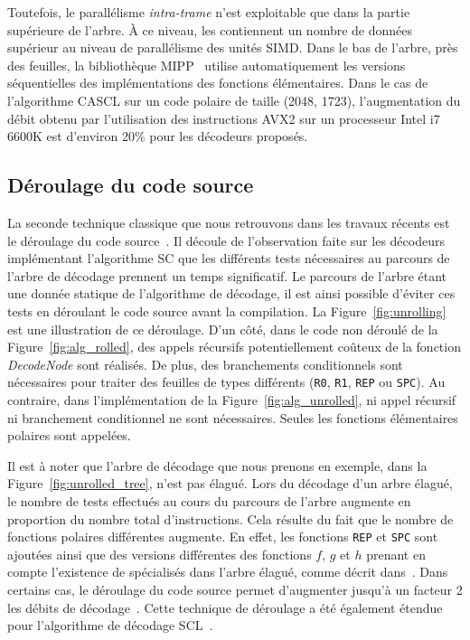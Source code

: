Toutefois, le parallélisme \textit{intra-trame} n'est exploitable que dans la partie supérieure de l'arbre. \`A ce niveau, les \noeuds contiennent un nombre de données supérieur au niveau de parallélisme des unités SIMD. Dans le bas de l'arbre, près des feuilles, la bibliothèque MIPP~\cite{cassagne_efficient_2015} utilise automatiquement les versions séquentielles des implémentations des fonctions élémentaires. Dans le cas de l'algorithme CASCL sur un code polaire de taille (2048, 1723), l'augmentation du débit obtenu par l'utilisation des instructions AVX2 sur un processeur Intel i7 6600K est d'environ 20\% pour les décodeurs proposés.

\subsection{Déroulage du code source}
\label{subsec:unroll}
La seconde technique classique que nous retrouvons dans les travaux récents est le déroulage du code source~\cite{sarkis_autogenerating_2014,giard_fast_2014,cassagne_efficient_2015,cassagne_energy_2016}. Il découle de l'observation faite sur les décodeurs implémentant l'algorithme SC que les différents tests nécessaires au parcours de l'arbre de décodage prennent un temps significatif. Le parcours de l'arbre étant une donnée statique de l'algorithme de décodage, il est ainsi possible d'éviter ces tests en \og déroulant \fg le code source avant la compilation. La Figure~\ref{fig:unrolling} est une illustration de ce déroulage. D'un côté, dans le code non déroulé de la Figure~\ref{fig:alg_rolled}, des appels récursifs potentiellement coûteux de la fonction \textit{DecodeNode} sont réalisés. De plus, des branchements conditionnels sont nécessaires pour traiter des feuilles de types différents (\texttt{R0}, \texttt{R1}, \texttt{REP} ou \texttt{SPC}). Au contraire, dans l'implémentation de la Figure~\ref{fig:alg_unrolled}, ni appel récursif ni branchement conditionnel ne sont nécessaires. Seules les fonctions élémentaires polaires sont appelées.

Il est à noter que l'arbre de décodage que nous prenons en exemple, dans la Figure~\ref{fig:unrolled_tree}, n'est pas élagué. Lors du décodage d'un arbre élagué, le nombre de tests effectués au cours du parcours de l'arbre augmente en proportion du nombre total d'instructions. Cela résulte du fait que le nombre de fonctions polaires différentes augmente. En effet, les fonctions \texttt{REP} et \texttt{SPC} sont ajoutées ainsi que des versions différentes des fonctions $f$, $g$ et $h$ prenant en compte l'existence de \noeuds spécialisés dans l'arbre élagué, comme décrit dans~\cite{sarkis_fast_2014,cassagne_efficient_2015}. Dans certains cas, le déroulage du code source permet d'augmenter jusqu'à un facteur 2 les débits de décodage~\cite{sarkis_autogenerating_2014}. Cette technique de déroulage a été également étendue pour l'algorithme de décodage SCL~\cite{sarkis_fast_2016}.

